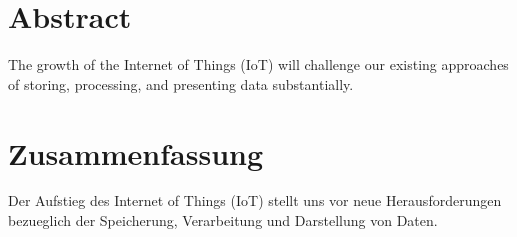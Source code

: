 
\cleardoublepage
{}
\section*{Abstract}

The growth of the Internet of Things (IoT) will challenge our existing approaches of storing, processing, and presenting data substantially.

\newpage
{}
\section*{Zusammenfassung}

Der Aufstieg des Internet of Things (IoT) stellt uns vor neue Herausforderungen bezueglich der Speicherung, Verarbeitung und Darstellung von Daten.
